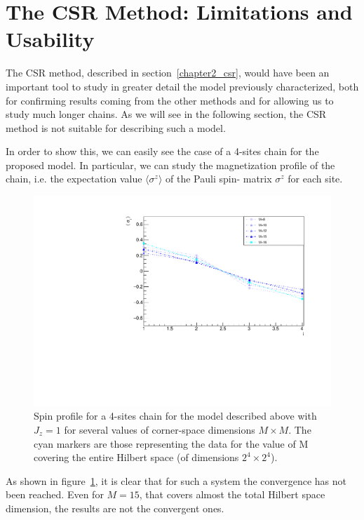\section{The CSR Method: Limitations and Usability}
The CSR method, described in section~\ref{chapter2_csr}, would have been an important tool to study in greater detail the model previously characterized, both for confirming results coming from the other methods and for allowing us to study much longer chains. As we will see in the following section, the CSR method is not suitable for describing such a model.

In order to show this, we can easily see the case of a 4-sites chain for the proposed model. In particular, we can study the magnetization profile of the chain, i.e. the expectation value $\langle \sigma^z \rangle$ of the Pauli spin- matrix $\sigma^z$ for each site. 

\begin{figure}[H]
    \centering
    \includegraphics[scale=0.7]{Figures/4sites/4sites_LM_convergenceIncreasingM.pdf}
    \caption{Spin profile for a 4-sites chain for the model described above with $J_z=1$ for several values of corner-space dimensions $M \times M$. The cyan markers are those representing the data for the value of M covering the entire Hilbert space (of dimensions $2^4 \times 2^4$).}
    \label{fig:4sites_LM_convergenceIncreasingM}
\end{figure}

As shown in figure~\ref{fig:4sites_LM_convergenceIncreasingM}, it is clear that for such a system the convergence has not been reached. Even for $M = 15$, that covers almost the total Hilbert space dimension, the results are not the convergent ones.

